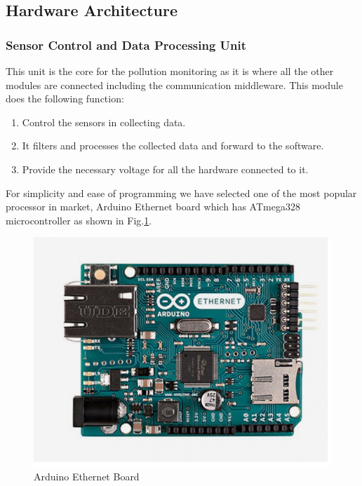 \documentclass[12pt,a4paper,oneside]{report}
\begin{document}
     \subsection*{Hardware Architecture}
\subsubsection*{Sensor Control and Data Processing Unit}
This unit is the core for the pollution monitoring as it is where all the other modules are connected including the communication middleware. This module does the following function:


\begin{enumerate}

\item Control the sensors in collecting data.
\item It filters and processes the collected data and forward to the software.
\item Provide the necessary voltage for all the hardware connected to it.

\end{enumerate}
For simplicity and ease of programming we have selected one of the most popular processor in market, Arduino Ethernet board which has ATmega328 microcontroller as shown in Fig.\ref{Arduino}. 

\begin{figure}[h]
  \begin{center}
  \includegraphics[scale=0.80]{images/figure3.png}
  \end{center}
  \caption{Arduino Ethernet Board}
  \label{Arduino}
\end{figure}
\end{document}
